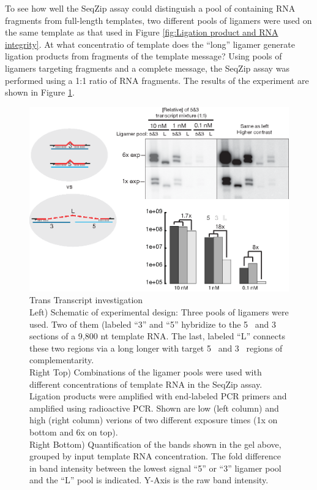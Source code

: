     To see how well the SeqZip assay could distinguish a pool of containing RNA fragments from full-length templates, two different pools of ligamers were used on the same template as that used in Figure \ref{fig:Ligation product and RNA integrity}. At what concentratio of template does the ``long'' ligamer generate ligation products from fragments of the template message? Using pools of ligamers targeting fragments and a complete message, the SeqZip assay was performed using a 1:1 ratio of RNA fragments. The results of the experiment are shown in Figure \ref{fig: trans Tx for degregation}.

  	\begin{figure}[htbp] %
    	\centering 
    	\includegraphics{Figures/SeqZipMethod/TransRNAWithSeqZip.eps}
    	\caption[Trans Transcript investigation]
    	{
	      Trans Transcript investigation\\
  	    Left) Schematic of experimental design: Three pools of ligamers were used. Two of them (labeled ``3'' and ``5'' hybridize to the 5\textprime~ and 3\textprime~ sections of a 9,800 nt template RNA. The last, labeled ``L'' connects these two regions via a long longer with target 5\textprime~ and 3\textprime~ regions of complementarity. \\
        Right Top) Combinations of the ligamer pools were used with different concentrations of template RNA in the SeqZip assay. Ligation products were amplified with end-labeled PCR primers and amplified using radioactive PCR. Shown are low (left column) and high (right column) verions of two different exposure times (1x on bottom and 6x on top). \\
        Right Bottom) Quantification of the bands shown in the gel above, grouped by input template RNA concentration. The fold difference in band intensity between the lowest signal ``5'' or ``3'' ligamer pool and the ``L'' pool is indicated. Y-Axis is the raw band intensity.
		    }
   	 \label{fig: trans Tx for degregation}
	 	 \end{figure}

